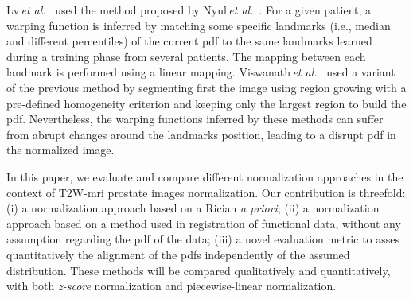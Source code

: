 Lv\,\textit{et al.}~\cite{lv2009computerized} used the method proposed by Nyul\,\textit{et al.}~\cite{nyul2000new}.
For a given patient, a warping function is inferred by matching some specific landmarks (i.e., median and different percentiles) of the current \ac{pdf} to the same landmarks learned during a training phase from several patients. 
The mapping between each landmark is performed using a linear mapping.
Viswanath\,\textit{et al.}~\cite{viswanath2012central} used a variant of the previous method by segmenting first the image using region growing with a pre-defined homogeneity criterion and keeping only the largest region to build the \ac{pdf}.
Nevertheless, the warping functions inferred by these methods can suffer from abrupt changes around the landmarks position, leading to a disrupt \ac{pdf} in the normalized image.  

In this paper, we evaluate and compare different normalization approaches in the context of T2W-\ac{mri} prostate images normalization. Our contribution is threefold: (i) a normalization approach based on a Rician \textit{a priori}; (ii) a normalization approach based on a method used in registration of functional data, without any assumption regarding the \ac{pdf} of the data; (iii) a novel evaluation metric to asses quantitatively the alignment of the \acp{pdf} independently of the assumed distribution. 
These methods will be compared qualitatively and quantitatively, with both \textit{z-score} normalization and piecewise-linear normalization.

